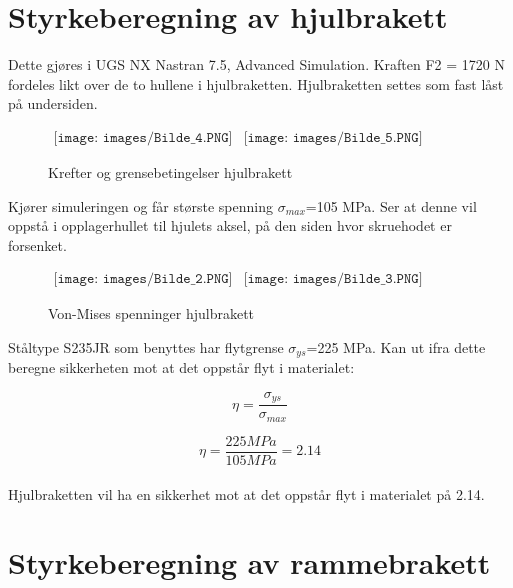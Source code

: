 \section{Styrkeberegning av hjulbrakett}
Dette gjøres i UGS NX Nastran 7.5, Advanced Simulation. Kraften F2 = 1720 N fordeles likt over de to hullene i hjulbraketten. Hjulbraketten settes som fast låst på undersiden.

\begin{figure}[H]
\begin{center}$
\begin{array}{ccc}
\texttt{[image: images/Bilde\_4.PNG]} &
\texttt{[image: images/Bilde\_5.PNG]} &  
\end{array}$
\end{center}
\caption{Krefter og grensebetingelser hjulbrakett}
\end{figure}

Kjører simuleringen og får største spenning $\sigma_{max}$=105 MPa. Ser at denne vil oppstå i opplagerhullet til hjulets aksel, på den siden hvor skruehodet er forsenket.

\begin{figure}[H]
\begin{center}$
\begin{array}{ccc}
\texttt{[image: images/Bilde\_2.PNG]} &
\texttt{[image: images/Bilde\_3.PNG]} &  
\end{array}$
\end{center}
\caption{Von-Mises spenninger hjulbrakett}
\end{figure}

Ståltype S235JR som benyttes har flytgrense $\sigma_{ys}$=225 MPa. Kan ut ifra dette beregne sikkerheten mot at det oppstår flyt i materialet:

\begin{equation}
\eta=\frac{\sigma_{ys}}{\sigma_{max}}
\end{equation}

\begin{equation}
\eta=\frac{225 MPa}{105 MPa}=2.14
\end{equation}\\

Hjulbraketten vil ha en sikkerhet mot at det oppstår flyt i materialet på 2.14.

\section{Styrkeberegning av rammebrakett}

